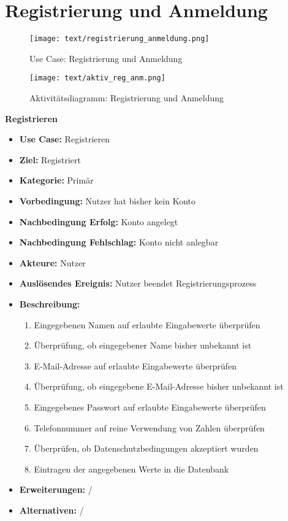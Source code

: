 \section{Registrierung und Anmeldung}
\begin{figure}[h!]
	\centering
	\texttt{[image: text/registrierung\_anmeldung.png]}
	\caption{Use Case: Registrierung und Anmeldung}
	\label{uc_reg_anm}
\end{figure}
\begin{figure}[h!]
	\centering
	\texttt{[image: text/aktiv\_reg\_anm.png]}
	\caption{Aktivitätsdiagramm: Registrierung und Anmeldung}
	\label{ak_reg_anm}
\end{figure}
\textbf{Registrieren}
\begin{itemize}
	\item \textbf{Use Case:} Registrieren
	\item \textbf{Ziel:} Registriert
	\item \textbf{Kategorie:} Primär
	\item \textbf{Vorbedingung:} Nutzer hat bisher kein Konto
	\item \textbf{Nachbedingung Erfolg:} Konto angelegt
	\item \textbf{Nachbedingung Fehlschlag:} Konto nicht anlegbar
	\item \textbf{Akteure:} Nutzer
	\item \textbf{Auslösendes Ereignis:} Nutzer beendet Registrierungsprozess
	\item \textbf{Beschreibung:} \begin{enumerate}
		\item Eingegebenen Namen auf erlaubte Eingabewerte überprüfen
		\item Überprüfung, ob eingegebener Name bisher unbekannt ist
		\item E-Mail-Adresse auf erlaubte Eingabewerte überprüfen
		\item Überprüfung, ob eingegebene E-Mail-Adresse bisher unbekannt ist
		\item Eingegebenes Passwort auf erlaubte Eingabewerte überprüfen
		\item Telefonnummer auf reine Verwendung von Zahlen überprüfen
		\item Überprüfen, ob Datenschutzbedingungen akzeptiert wurden
		\item Eintragen der angegebenen Werte in die Datenbank
	\end{enumerate}
	\item \textbf{Erweiterungen:} /
	\item \textbf{Alternativen:} /
\end{itemize}


